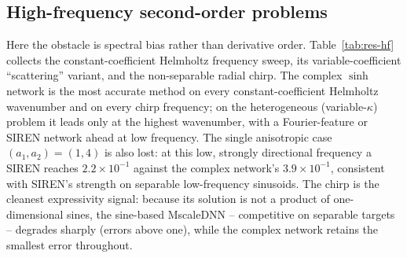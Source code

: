 
\subsection{High-frequency second-order problems}\label{ssec:res-hf}

Here the obstacle is spectral bias rather than derivative order. Table~\ref{tab:res-hf}
collects the constant-coefficient Helmholtz frequency sweep, its
variable-coefficient ``scattering'' variant, and the non-separable radial
chirp. The complex \(\sinh\) network is the most accurate method on every
constant-coefficient Helmholtz wavenumber and on every chirp frequency; on the
heterogeneous (variable-\(\kappa\)) problem it leads only at the highest
wavenumber, with a Fourier-feature or SIREN network ahead at low frequency. The
single anisotropic case \((a_1,a_2)=(1,4)\) is also lost: at this low, strongly
directional frequency a SIREN reaches \(2.2\times10^{-1}\) against the complex
network's \(3.9\times10^{-1}\), consistent with SIREN's strength on separable
low-frequency sinusoids.
The chirp is the cleanest expressivity signal: because its solution is not a
product of one-dimensional sines, the sine-based MscaleDNN -- competitive on
separable targets -- degrades sharply (errors above one), while the complex
network retains the smallest error throughout.

